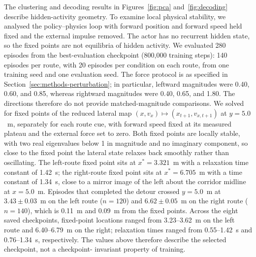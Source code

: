 \documentclass{article}
\begin{document}
The clustering and decoding results in Figures~\ref{fig:pca}
and~\ref{fig:decoding} describe hidden-activity geometry. To examine local
physical stability, we analysed the policy--physics loop with forward
position and forward speed held fixed and the external impulse removed.
\label{sec:results-attractor}
The actor has no recurrent hidden state, so the fixed points are not
equilibria of hidden activity. We evaluated 280 episodes from the
best-evaluation checkpoint (800,000 training steps): 140 episodes per route,
with 20 episodes per condition on each route, from one training seed and
one evaluation seed. The force protocol is as specified in
Section~\ref{sec:methods-perturbation}; in particular, leftward magnitudes
were 0.40, 0.60, and 0.85, whereas rightward magnitudes were 0.40, 0.65,
and 1.80. The directions therefore do not provide matched-magnitude
comparisons. We solved for fixed points of the reduced lateral map
$(x,v_x)\mapsto(x_{t+1},v_{x,t+1})$ at $y=5.0$~m, separately for each
route cue, with forward speed fixed at its measured plateau and the
external force set to zero.
Both fixed points are locally stable, with two real eigenvalues below 1 in
magnitude and no imaginary component, so close to the fixed point the
lateral state relaxes back smoothly rather than oscillating.
The left-route fixed point sits at $x^{*}=3.321$~m with a relaxation time
constant of 1.42~s; the right-route fixed point sits at $x^{*}=6.705$~m
with a time constant of 1.34~s, close to a mirror image of the left about
the corridor midline at $x=5.0$~m.
Episodes that completed the detour crossed $y=5.0$~m at
$3.43\pm0.03$~m on the left route ($n=120$) and $6.62\pm0.05$~m on the
right route ($n=140$), which is 0.11~m and 0.09~m from the fixed points.
Across the eight saved checkpoints, fixed-point locations ranged from
3.23--3.62~m on the left route and 6.40--6.79~m on the right; relaxation
times ranged from 0.55--1.42~s and 0.76--1.34~s, respectively. The values
above therefore describe the selected checkpoint, not a checkpoint-
invariant property of training.
\end{document}
